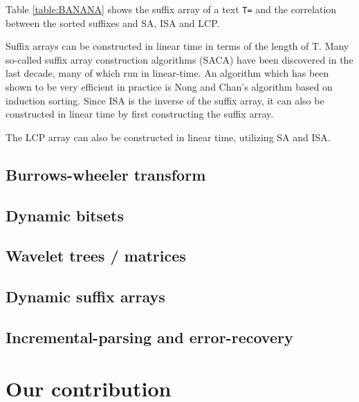 Table \ref{table:BANANA} shows the suffix array of a text \texttt{T=} and the correlation
between the sorted suffixes and SA, ISA and LCP.


Suffix arrays can be constructed in linear time in terms of the length of T. Many
so-called suffix array construction algorithms (SACA) have been discovered in the last
decade\cite{SuffixArrayConstruction}, many of which run in linear-time. An algorithm
which has been shown to be very efficient in practice is Nong and
Chan's\cite{LinearTimeSuffixArraySAIS} algorithm based on induction sorting. Since ISA is
the inverse of the suffix array, it can also be constructed in linear time by first
constructing the suffix array.

The LCP array can also be constructed in linear time, utilizing SA and ISA.



\subsection{Burrows-wheeler transform}


\subsection{Dynamic bitsets}

\subsection{Wavelet trees / matrices}

\subsection{Dynamic suffix arrays}


\subsection{Incremental-parsing and error-recovery}



\section{Our contribution}

